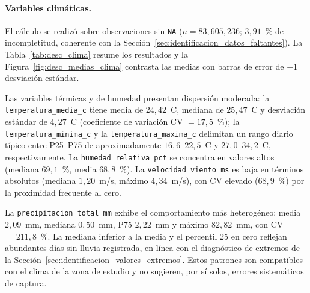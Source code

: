 \paragraph{Variables climáticas.} El cálculo se realizó sobre observaciones sin \texttt{NA} ($n = 83{,}605{,}236$; $3{,}91$~\% de incompletitud, coherente con la Sección~\ref{sec:identificacion_datos_faltantes}). La Tabla~\ref{tab:desc_clima} resume los resultados y la Figura~\ref{fig:desc_medias_clima} contrasta las medias con barras de error de $\pm 1$ desviación estándar.

Las variables térmicas y de humedad presentan dispersión moderada: la \texttt{temperatura\_media\_c} tiene media de $24{,}42$~\textdegree C, mediana de $25{,}47$~\textdegree C y desviación estándar de $4{,}27$~\textdegree C (coeficiente de variación CV $= 17{,}5$~\%); la \texttt{temperatura\_minima\_c} y la \texttt{temperatura\_maxima\_c} delimitan un rango diario típico entre P25--P75 de aproximadamente $16{,}6$--$22{,}5$~\textdegree C y $27{,}0$--$34{,}2$~\textdegree C, respectivamente. La \texttt{humedad\_relativa\_pct} se concentra en valores altos (mediana $69{,}1$~\%, media $68{,}8$~\%). La \texttt{velocidad\_viento\_ms} es baja en términos absolutos (mediana $1{,}20$~m/s, máximo $4{,}34$~m/s), con CV elevado ($68{,}9$~\%) por la proximidad frecuente al cero.

La \texttt{precipitacion\_total\_mm} exhibe el comportamiento más heterogéneo: media $2{,}09$~mm, mediana $0{,}50$~mm, P75 $2{,}22$~mm y máximo $82{,}82$~mm, con CV $= 211{,}8$~\%. La mediana inferior a la media y el percentil 25 en cero reflejan abundantes días sin lluvia registrada, en línea con el diagnóstico de extremos de la Sección~\ref{sec:identificacion_valores_extremos}. Estos patrones son compatibles con el clima de la zona de estudio y no sugieren, por sí solos, errores sistemáticos de captura.

